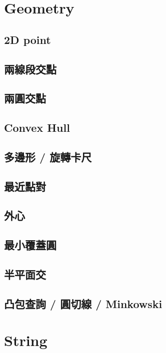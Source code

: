 \section{Geometry}

\subsection{2D point}

\subsection{兩線段交點}

\subsection{兩圓交點}

\subsection{Convex Hull}

\subsection{多邊形 / 旋轉卡尺}

\subsection{最近點對}

\subsection{外心}

\subsection{最小覆蓋圓}

\subsection{半平面交}

\subsection{凸包查詢 / 圓切線 / Minkowski}


\section{String}

